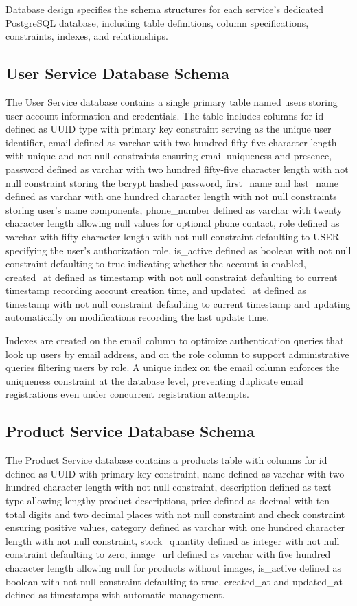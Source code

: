 Database design specifies the schema structures for each service's dedicated PostgreSQL database, including table definitions, column specifications, constraints, indexes, and relationships.

\subsection{User Service Database Schema}

The User Service database contains a single primary table named users storing user account information and credentials. The table includes columns for id defined as UUID type with primary key constraint serving as the unique user identifier, email defined as varchar with two hundred fifty-five character length with unique and not null constraints ensuring email uniqueness and presence, password defined as varchar with two hundred fifty-five character length with not null constraint storing the bcrypt hashed password, first\_name and last\_name defined as varchar with one hundred character length with not null constraints storing user's name components, phone\_number defined as varchar with twenty character length allowing null values for optional phone contact, role defined as varchar with fifty character length with not null constraint defaulting to USER specifying the user's authorization role, is\_active defined as boolean with not null constraint defaulting to true indicating whether the account is enabled, created\_at defined as timestamp with not null constraint defaulting to current timestamp recording account creation time, and updated\_at defined as timestamp with not null constraint defaulting to current timestamp and updating automatically on modifications recording the last update time.

Indexes are created on the email column to optimize authentication queries that look up users by email address, and on the role column to support administrative queries filtering users by role. A unique index on the email column enforces the uniqueness constraint at the database level, preventing duplicate email registrations even under concurrent registration attempts.

\subsection{Product Service Database Schema}

The Product Service database contains a products table with columns for id defined as UUID with primary key constraint, name defined as varchar with two hundred character length with not null constraint, description defined as text type allowing lengthy product descriptions, price defined as decimal with ten total digits and two decimal places with not null constraint and check constraint ensuring positive values, category defined as varchar with one hundred character length with not null constraint, stock\_quantity defined as integer with not null constraint defaulting to zero, image\_url defined as varchar with five hundred character length allowing null for products without images, is\_active defined as boolean with not null constraint defaulting to true, created\_at and updated\_at defined as timestamps with automatic management.

